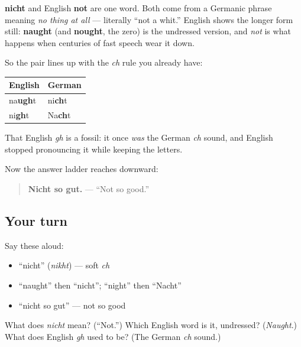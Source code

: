 \begin{cousinweb}
\textbf{nicht} and English \textbf{not} are one word. Both come from a Germanic phrase meaning \emph{no thing at all} — literally \textquotedblleft{}not a whit.\textquotedblright{} English shows the longer form still: \textbf{naught} (and \textbf{nought}, the zero) is the undressed version, and \emph{not} is what happens when centuries of fast speech wear it down.

So the pair lines up with the \emph{ch} rule you already have:

\noindent
\begin{tabularx}{\linewidth}{@{}>{\raggedright\arraybackslash}X>{\raggedright\arraybackslash}X@{}}
\toprule
\textbf{English} & \textbf{German} \\
\midrule
na\textbf{ugh}t & ni\textbf{ch}t \\
ni\textbf{gh}t & Na\textbf{ch}t \\
\bottomrule
\end{tabularx}

That English \emph{gh} is a fossil: it once \emph{was} the German \emph{ch} sound, and English stopped pronouncing it while keeping the letters.

Now the answer ladder reaches downward:

\begin{quote}
\textbf{Nicht so gut.} — \textquotedblleft{}Not so good.\textquotedblright{}
\end{quote}
\end{cousinweb}

\subsection*{Your turn}
Say these aloud:

\begin{itemize}
\raggedright
  \item \textquotedblleft{}nicht\textquotedblright{} (\emph{nikht}) — soft \emph{ch}
  \item \textquotedblleft{}naught\textquotedblright{} then \textquotedblleft{}nicht\textquotedblright{}; \textquotedblleft{}night\textquotedblright{} then \textquotedblleft{}Nacht\textquotedblright{}
  \item \textquotedblleft{}nicht so gut\textquotedblright{} — not so good
\end{itemize}

\begin{tcolorbox}[breakable,colback=teal!4,colframe=teal!35!black,title={Before you move on}]
What does \emph{nicht} mean? (\textquotedblleft{}Not.\textquotedblright{}) Which English word is it, undressed? (\emph{Naught}.) What does English \emph{gh} used to be? (The German \emph{ch} sound.)
\end{tcolorbox}
